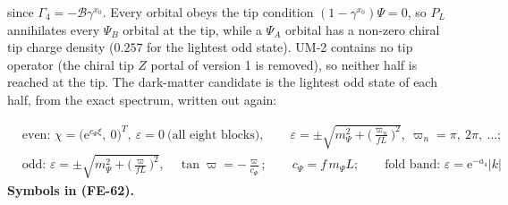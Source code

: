 \documentclass[
  10pt,
]{article}
\begin{document}
since \(\Gamma_4 = -\mathcal{B}\gamma^{x_0}\). Every orbital obeys the
tip condition \((1 - \gamma^{x_0})\Psi = 0\), so \(P_L\) annihilates
every \(\Psi_B\) orbital at the tip, while a \(\Psi_A\) orbital has a
non-zero chiral tip charge density (\(0.257\) for the lightest odd
state). UM-2 contains no tip operator (the chiral tip \(Z\) portal of
version 1 is removed), so neither half is reached at the tip. The
dark-matter candidate is the lightest odd state of each half, from the
exact spectrum, written out again:

\[
\begin{aligned}
&\text{even: }\chi = \big(\mathrm{e}^{c_\Psi\xi},\ 0\big)^T,\ \varepsilon = 0\ \text{(all eight
 blocks)},\qquad
 \varepsilon = \pm\sqrt{m_\Psi^2 + \Big(\frac{\varpi_n}{fL}\Big)^2},\ \varpi_n = \pi,\ 2\pi,\ \dots;\\
&\text{odd: }\varepsilon = \pm\sqrt{m_\Psi^2 + \Big(\frac{\varpi}{fL}\Big)^2},\quad \tan\varpi =
 -\frac{\varpi}{c_\Psi};\qquad
 c_\Psi = f\,m_\Psi L;\qquad \text{fold band: }\varepsilon = \mathrm{e}^{-a_4}\lvert k\rvert
\end{aligned} \tag{FE-62}
\] \textbf{Symbols in (FE-62).}
\end{document}
